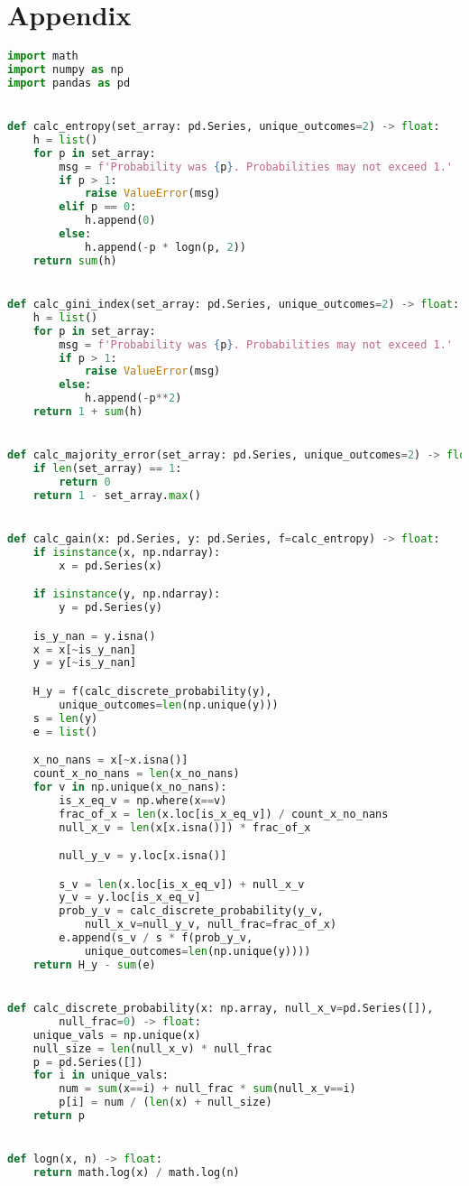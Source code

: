 \documentclass[12pt, fullpage,letterpaper]{article}
\begin{document}
\section{Appendix}

\begin{lstlisting}[language=Python, caption=DecisionTree.error\_calcs]
import math
import numpy as np
import pandas as pd


def calc_entropy(set_array: pd.Series, unique_outcomes=2) -> float:
    h = list()
    for p in set_array:
        msg = f'Probability was {p}. Probabilities may not exceed 1.'
        if p > 1:
            raise ValueError(msg)
        elif p == 0:
            h.append(0)
        else:
            h.append(-p * logn(p, 2))
    return sum(h)


def calc_gini_index(set_array: pd.Series, unique_outcomes=2) -> float:
    h = list()
    for p in set_array:
        msg = f'Probability was {p}. Probabilities may not exceed 1.'
        if p > 1:
            raise ValueError(msg)
        else:
            h.append(-p**2)
    return 1 + sum(h)


def calc_majority_error(set_array: pd.Series, unique_outcomes=2) -> float:
    if len(set_array) == 1:
        return 0
    return 1 - set_array.max()


def calc_gain(x: pd.Series, y: pd.Series, f=calc_entropy) -> float:
    if isinstance(x, np.ndarray):
        x = pd.Series(x)

    if isinstance(y, np.ndarray):
        y = pd.Series(y)

    is_y_nan = y.isna()
    x = x[~is_y_nan]
    y = y[~is_y_nan]

    H_y = f(calc_discrete_probability(y), 
        unique_outcomes=len(np.unique(y)))
    s = len(y)
    e = list()

    x_no_nans = x[~x.isna()]
    count_x_no_nans = len(x_no_nans)
    for v in np.unique(x_no_nans):
        is_x_eq_v = np.where(x==v)
        frac_of_x = len(x.loc[is_x_eq_v]) / count_x_no_nans
        null_x_v = len(x[x.isna()]) * frac_of_x

        null_y_v = y.loc[x.isna()]

        s_v = len(x.loc[is_x_eq_v]) + null_x_v
        y_v = y.loc[is_x_eq_v]
        prob_y_v = calc_discrete_probability(y_v, 
            null_x_v=null_y_v, null_frac=frac_of_x)
        e.append(s_v / s * f(prob_y_v, 
            unique_outcomes=len(np.unique(y))))
    return H_y - sum(e)


def calc_discrete_probability(x: np.array, null_x_v=pd.Series([]), 
        null_frac=0) -> float:
    unique_vals = np.unique(x)
    null_size = len(null_x_v) * null_frac
    p = pd.Series([])
    for i in unique_vals:
        num = sum(x==i) + null_frac * sum(null_x_v==i)
        p[i] = num / (len(x) + null_size)
    return p


def logn(x, n) -> float:
    return math.log(x) / math.log(n)

\end{lstlisting}
\end{document}

